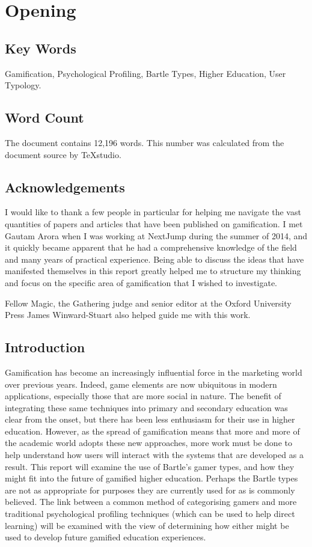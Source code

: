 \documentclass[12pt,a4paper,twoside]{report}
\begin{document}
\chapter{Opening}
\section{Key Words}
Gamification, Psychological Profiling, Bartle Types, Higher Education, User Typology.

\section{Word Count}
The document contains 12,196 words. This number was calculated from the document source by TeXstudio.

\section{Acknowledgements}
I would like to thank a few people in particular for helping me navigate the vast quantities of papers and articles that have been published on gamification. I met Gautam Arora when I was working at NextJump during the summer of 2014, and it quickly became apparent that he had a comprehensive knowledge of the field and many years of practical experience. Being able to discuss the ideas that have manifested themselves in this report greatly helped me to structure my thinking and focus on the specific area of gamification that I wished to investigate.

Fellow Magic, the Gathering judge and senior editor at the Oxford University Press James Winward-Stuart also helped guide me with this work.

\section{Introduction}
Gamification has become an increasingly influential force in the marketing world over previous years. Indeed, game elements are now ubiquitous in modern applications, especially those that are more social in nature. The benefit of integrating these same techniques into primary and secondary education was clear from the onset, but there has been less enthusiasm for their use in higher education. However, as the spread of gamification means that more and more of the academic world adopts these new approaches, more work must be done to help understand how users will interact with the systems that are developed as a result. This report will examine the use of Bartle's gamer types, and how they might fit into the future of gamified higher education. Perhaps the Bartle types are not as appropriate for purposes they are currently used for as is commonly believed. The link between a common method of categorising gamers and more traditional psychological profiling techniques (which can be used to help direct learning) will be examined with the view of determining how either might be used to develop future gamified education experiences.
\end{document}
